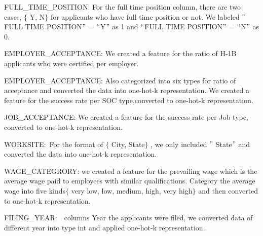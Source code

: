 \documentclass[12pt]{article}
\begin{document}
\begin{justify}
FULL\_TIME\_POSITION: For the full time position column, there are two cases, $ \{ $ Y, N$ \} $  for applicants who have full time position or not. We labeled $``$FULL TIME POSITION$"$  = $``$Y$"$  as 1 and $``$FULL TIME POSITION$"$  = $``$N$"$  as 0.
\end{justify}\par

\begin{justify}
EMPLOYER\_ACCEPTANCE:  We created a feature for the ratio of H-1B applicants who were certified per employer. 
\end{justify}\par

\begin{justify}
EMPLOYER\_ACCEPTANCE: Also categorized into six types for ratio of acceptance and converted the data into one-hot-k representation. We created a feature for the success rate per SOC type,converted to one-hot-k representation.
\end{justify}\par

\begin{justify}
JOB\_ACCEPTANCE: We created a feature for the success rate per Job type, converted to one-hot-k representation.
\end{justify}\par

\begin{justify}
WORKSITE:\ For the format of $ \{ $ City, State$ \} $ ,  we only included $"$ State$"$  and converted the data into one-hot-k representation.
\end{justify}\par

\begin{justify}
WAGE\_CATEGRORY: we created a feature for the prevailing wage which is the average wage paid to employees with similar qualifications. Category the average wage into five kinds$ \{ $ very low, low, medium, high, very high$ \} $  and then converted to one-hot-k representation. 
\end{justify}\par

\begin{justify}
FILING\_YEAR:\ \ columns Year the applicants were filed,  we converted data of different year into type int and applied one-hot-k representation.
\end{justify}\par
\end{document}
